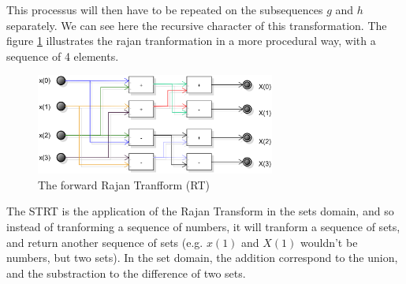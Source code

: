 This processus will then have to be repeated on the subsequences $g$ and $h$ separately. We can see here the recursive character of this transformation. The figure \ref{fig:diagram:flowchart:rajan} illustrates the rajan tranformation in a more procedural way, with a sequence of 4 elements. 

\begin{figure}[H]
	\centering
	\includegraphics[width=0.7\textwidth]{images/diagrams/flowchart_rajan_transform}
	\caption{The forward Rajan Tranfform (RT)}
	\label{fig:diagram:flowchart:rajan}	
\end{figure}


The \gls{STRT} is the application of the Rajan Transform in the sets domain, and so instead of tranforming a sequence of numbers, it will tranform a sequence of sets, and return another sequence of sets (e.g. $x(1)$ and $X(1)$ wouldn't be numbers, but two sets). In the set domain, the addition correspond to the union, and the substraction to the difference of two sets.




